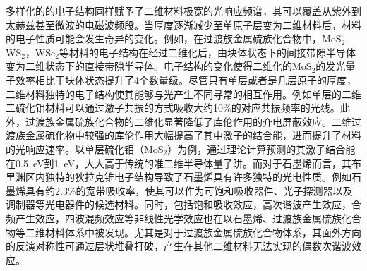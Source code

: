     多样化的的电子结构同样赋予了二维材料极宽的光响应频谱，其可以覆盖从紫外到太赫兹甚至微波的电磁波频段。当厚度逐渐减少至单原子层变为二维材料后，材料的电子性质可能会发生奇异的变化。例如，在过渡族金属硫族化合物中，MoS$_2$, WS$_2$，WSe$_2$等材料的电子结构在经过二维化后，由块体状态下的间接带隙半导体变为二维状态下的直接带隙半导体。电子结构的变化使得二维化的MoS$_2$的发光量子效率相比于块体状态提升了4个数量级。尽管只有单层或者是几层原子的厚度，二维材料独特的电子结构使其能够与光产生不同寻常的相互作用。例如单层的二维二硫化钼材料可以通过激子共振的方式吸收大约10\%的对应共振频率的光线。此外，过渡族金属硫族化合物的二维化显著降低了库伦作用的介电屏蔽效应。二维过渡族金属硫化物中较强的库伦作用大幅提高了其中激子的结合能，进而提升了材料的光响应速率。以单层硫化钼（MoS$_2$）为例，通过理论计算预测的其激子结合能在\SI{0.5}{\electronvolt}到\SI{1}{\electronvolt}，大大高于传统的准二维半导体量子阱。而对于石墨烯而言，其布里渊区内独特的狄拉克锥电子结构导致了石墨烯具有许多独特的光电性质。例如石墨烯具有约2.3\%的宽带吸收率，使其可以作为可饱和吸收器件、光子探测器以及调制器等光电器件的候选材料。同时，包括饱和吸收效应，高次谐波产生效应，合频产生效应，四波混频效应等非线性光学效应也在以石墨烯、过渡族金属硫族化合物等二维材料体系中被发现。尤其是对于过渡族金属硫族化合物体系，其面外方向的反演对称性可通过层状堆叠打破，产生在其他二维材料无法实现的偶数次谐波效应。%
    
